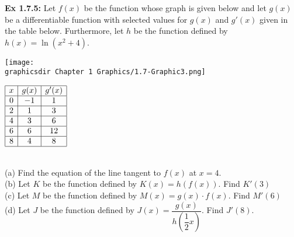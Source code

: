 \begin{tcolorbox}[example]
    \textbf{Ex 1.7.5: } Let $f(x)$ be the function whose graph is given below and let $g(x)$ be a differentiable function with selected values for $g(x)$ and $g'(x)$ given in the table below. Furthermore, let $h$ be the function defined by $h(x) = \ln \left(x^2 + 4\right)$. \\
    \begin{minipage}[t]{0.75\textwidth} \vspace{0pt}%
        \texttt{[image: \\graphicsdir Chapter 1 Graphics/1.7-Graphic3.png]}
    \end{minipage} \hfill \begin{minipage}[t]{0.2\textwidth} \vspace{0pt}%
        \def\arraystretch{1.4}
        $\begin{array}{|c|c|c|}
            \hline
            x & g(x) & g'(x) \\ \hline
            0 & -1 & 1 \\ \hline
            2 & 1 & 3 \\ \hline
            4 & 3 & 6 \\ \hline
            6 & 6 & 12 \\ \hline
            8 & 4 & 8 \\
            \hline
        \end{array}$
    \end{minipage} \\[11pt]

    (a) Find the equation of the line tangent to $f(x)$ at $x = 4$. \\[11pt]
    (b) Let $K$ be the function defined by $K(x) = h(f(x))$. Find $K'(3)$ \\[11pt]
    (c) Let $M$ be the function defined by $M(x) = g(x) \cdot f(x)$. Find $M'(6)$ \\[11pt]
    (d) Let $J$ be the function defined by $J(x) = \dfrac{g(x)}{h\left(\dfrac{1}{2}x\right)}$. Find $J'(8)$.
\end{tcolorbox}
